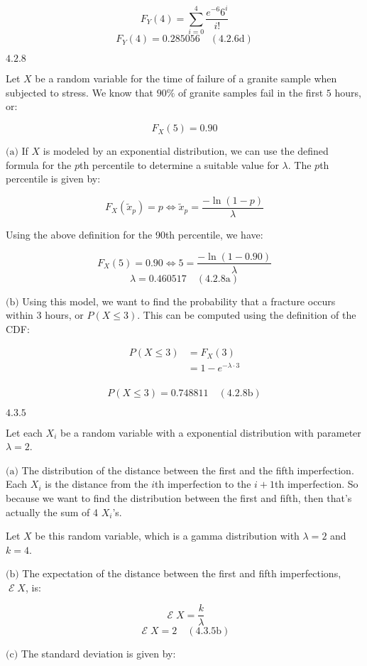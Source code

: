 \documentclass{article}
\newcommand{\problem}[2]{$\boxed{\text{#1.#2}}$}
\newcommand{\subproblem}[3]{$\boxed{\text{(#3)}}$}
\newcommand{\subsolution}[4]{\boxed{#4\quad(\text{#1.#2#3})}}
\newcommand{\multistep}[1]{\begin{array}{rl} #1 \end{array}}
\DeclareMathOperator{\E}{\mathcal{E}}
\begin{document}
\[
F_Y(4)=\sum\limits_{i=0}^4 \frac{e^{-6}6^i}{i!}
\] \[
\subsolution{4.2}{6}{d}{F_Y(4)=0.285056}
\]

%
\problem{4.2}{8}

Let $X$ be a random variable for the time of failure of a granite
sample when subjected to stress. We know that $90\%$ of granite
samples fail in the first $5$ hours, or:

\[
F_X(5)=0.90
\]

%
\subproblem{4.2}{8}{a} If $X$ is modeled by an exponential
distribution, we can use the defined formula for the $p$th percentile
to determine a suitable value for $\lambda$. The $p$th percentile is
given by:

\[
F_X(\tilde{x}_p)=p \Leftrightarrow \tilde{x}_p=\frac{-\ln(1-p)}{\lambda}
\]

Using the above definition for the 90th percentile, we have:

\[
F_X(5)=0.90 \Leftrightarrow 5=\frac{-\ln(1-0.90)}{\lambda}
\] \[
\subsolution{4.2}{8}{a}{\lambda = 0.460517}
\]

%
\subproblem{4.2}{8}{b} Using this model, we want to find the
probability that a fracture occurs within 3 hours, or $P(X\le3)$. This
can be computed using the definition of the CDF:

\[
\multistep{
P(X\le3)&=F_X(3) \\
&=1-e^{-\lambda\cdot3} \\
}
\]

\[
\subsolution{4.2}{8}{b}{P(X\le3)=0.748811}
\]

%
\problem{4.3}{5}

Let each $X_i$ be a random variable with a exponential distribution
with parameter $\lambda=2$.

%
\subproblem{4.3}{5}{a} The distribution of the distance between the
first and the fifth imperfection. Each $X_i$ is the distance from the
$i$th imperfection to the $i+1$th imperfection. So because we want to
find the distribution between the first and fifth, then that's
actually the sum of 4 $X_i$'s.

Let $X$ be this random variable, which is a gamma distribution with
$\lambda=2$ and $k=4$.

%
\subproblem{4.3}{5}{b} The expectation of the distance between the
first and fifth imperfections, $\E{}X$, is:

\[
\E X=\frac{k}{\lambda}
\] \[
\subsolution{4.3}{5}{b}{\E X=2}
\]

%
\subproblem{4.3}{5}{c} The standard deviation is given by:
\end{document}
